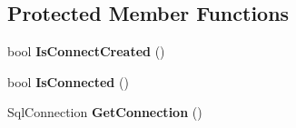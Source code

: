 \subsection*{Protected Member Functions}
\begin{DoxyCompactItemize}
\item 
\hypertarget{class_tune_store_1_1_model_1_1_d_a_l_ac7f3fcd580550051af6d55ad6f60b4d6}{bool {\bfseries Is\+Connect\+Created} ()}\label{class_tune_store_1_1_model_1_1_d_a_l_ac7f3fcd580550051af6d55ad6f60b4d6}

\item 
\hypertarget{class_tune_store_1_1_model_1_1_d_a_l_afbed4e1710000cf02ff78502fc129e91}{bool {\bfseries Is\+Connected} ()}\label{class_tune_store_1_1_model_1_1_d_a_l_afbed4e1710000cf02ff78502fc129e91}

\item 
\hypertarget{class_tune_store_1_1_model_1_1_d_a_l_a95b31c4a1c14fda499a962abf81df3c5}{Sql\+Connection {\bfseries Get\+Connection} ()}\label{class_tune_store_1_1_model_1_1_d_a_l_a95b31c4a1c14fda499a962abf81df3c5}


\end{DoxyCompactItemize}
